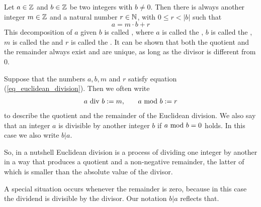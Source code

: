 Let $ a \in \mathbb{Z} $ and $ b \in \mathbb{Z} $ be two integers with $b\neq 0$. Then there is always another integer $ m \in \mathbb{Z} $ and a natural number $ r \in \mathbb{N} $, with $ 0 \leq r <|b| $ such that
\begin{equation}
\label{eq_euclidean_division}
a = m \cdot b + r
\end{equation}
This decomposition of $a$ given $b$ is called , where $ a $ is called the , $ b $ is called the , $m$ is called the  and $r$ is called the . It can be shown that both the quotient and the remainder always exist and are unique, as long as the divisor is different from $0$. 
\begin{notation}
\label{eq_euclidean_division_notation}
Suppose that the numbers $ a, b, m $ and $ r $ satisfy equation (\ref{eq_euclidean_division}). Then we often write 
\begin{equation}
\label{def_integer_division_and_modulus}
\begin{array}{lcr}
a \text{ div } b: = m, & & a \text{ mod } b: = r 
\end{array}
\end{equation}
to describe the quotient and the remainder of the Euclidean division. We also say that an integer $ a $ is divisible by another integer $ b $ if $ a \text{ mod } b = 0 $ holds. In this case we also write $ b | a $.
\end{notation}
So, in a nutshell Euclidean division is a process of dividing one integer by another in a way that produces a quotient and a non-negative remainder, the latter of which is smaller than the absolute value of the divisor. 

A special situation occurs whenever the remainder is zero, because in this case the dividend is divisible by the divisor. Our notation $b | a$ reflects that. 


